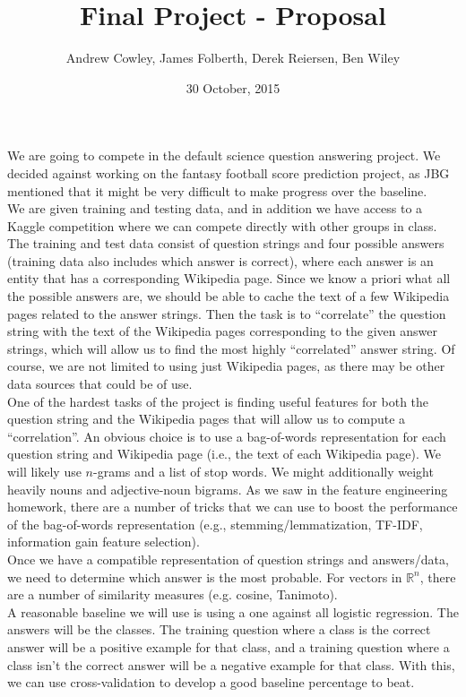\documentclass{article}
\title{Final Project - Proposal}
\date{30 October, 2015}
\author{Andrew Cowley, James Folberth, Derek Reiersen, Ben Wiley}
\newcommand{\reals}{\mathbb{R}}
\theoremstyle{mystuff}
\theoremstyle{myexample}
\theoremstyle{named}
\begin{document}
\maketitle

We are going to compete in the default science question answering project.  We decided against working on the fantasy football score prediction project, as JBG mentioned that it might be very difficult to make progress over the baseline.\\

We are given training and testing data, and in addition we have access to a Kaggle competition where we can compete directly with other groups in class.  The training and test data consist of question strings and four possible answers (training data also includes which answer is correct), where each answer is an entity that has a corresponding Wikipedia page.  Since we know a priori what all the possible answers are, we should be able to cache the text of a few Wikipedia pages related to the answer strings.  Then the task is to ``correlate'' the question string with the text of the Wikipedia pages corresponding to the given answer strings, which will allow us to find the most highly ``correlated'' answer string.  Of course, we are not limited to using just Wikipedia pages, as there may be other data sources that could be of use.\\

One of the hardest tasks of the project is finding useful features for both the question string and the Wikipedia pages that will allow us to compute a ``correlation''.  An obvious choice is to use a bag-of-words representation for each question string and Wikipedia page (i.e., the text of each Wikipedia page).  We will likely use $n$-grams and a list of stop words.  We might additionally weight heavily nouns and adjective-noun bigrams.  As we saw in the feature engineering homework, there are a number of tricks that we can use to boost the performance of the bag-of-words representation (e.g., stemming/lemmatization, TF-IDF, information gain feature selection).\\

Once we have a compatible representation of question strings and answers/data, we need to determine which answer is the most probable.  For vectors in $\reals^n$, there are a number of similarity measures (e.g. cosine, Tanimoto).\\

A reasonable baseline we will use is using a one against all logistic regression.  The answers will be the classes.  The training question where a class is the correct answer will be a positive example for that class, and a training question where a class isn't the correct answer will be a negative example for that class.  With this, we can use cross-validation to develop a good baseline percentage to beat. \\
\end{document}
